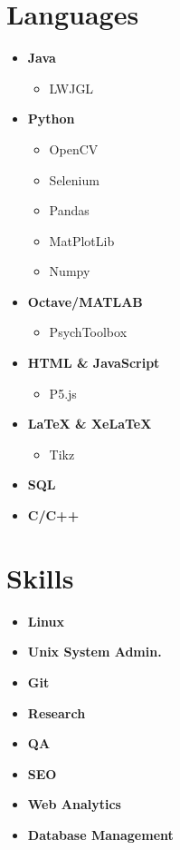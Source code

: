 \documentclass[]{chandan-cv}
\begin{document}
\begin{minipage}[t]{0.33\textwidth} 


\section{Languages}
	\begin{itemize}
		\setlength\itemsep{0em}
		\item \textbf{Java}
			\begin{itemize}
				\setlength\itemsep{0em}
				\item LWJGL
			\end{itemize}
		\item \textbf{Python}
			\begin{itemize}
				\setlength\itemsep{0em}
				\item OpenCV
				\item Selenium
				\item Pandas
				\item MatPlotLib
				\item Numpy
			\end{itemize}
		\item \textbf{Octave/MATLAB}
			\begin{itemize}
				\setlength\itemsep{0em}
				\item PsychToolbox
			\end{itemize}
		\item \textbf{HTML \& JavaScript}
			\begin{itemize}
				\setlength\itemsep{0em}
				\item P5.js
			\end{itemize}
		\item \textbf{LaTeX \& XeLaTeX}
			\begin{itemize}
				\setlength\itemsep{0em}
				\item Tikz
			\end{itemize}
		\item \textbf{SQL}
		\item \textbf{C/C++}
	\end{itemize}
\sectionsep


\section{Skills}
	\begin{itemize}
		\setlength\itemsep{0em}
		\item \textbf{Linux}
		\item \textbf{Unix System Admin.}
		\item \textbf{Git}
		\item \textbf{Research}
		\item \textbf{QA}
		\item \textbf{SEO}
		\item \textbf{Web Analytics}
		\item \textbf{Database Management}
	\end{itemize}
\sectionsep


\end{minipage}
\end{document}

